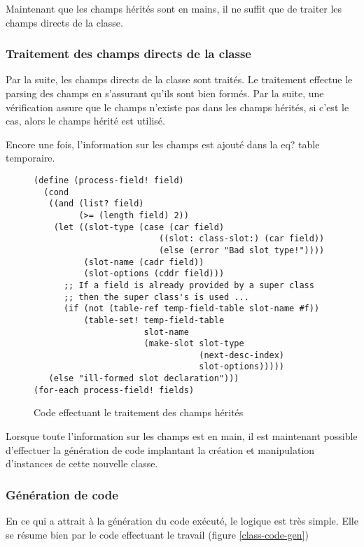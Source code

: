       Maintenant que les champs hérités sont en mains, il ne suffit que de
      traiter les champs directs de la classe.

    \subsubsection{Traitement des champs directs de la classe}
      Par la suite, les champs directs de la classe sont traités. Le
      traitement effectue le \og parsing \fg des champs en s'assurant
      qu'ils sont bien formés. Par la suite, une vérification assure
      que le champs n'existe pas dans les champs hérités, si c'est le
      cas, alors le champs hérité est utilisé.

      Encore une fois, l'information sur les champs est ajouté dans la
      \og eq? table \fg temporaire.

      \begin{figure}[h!]
        \begin{lstlisting}
(define (process-field! field)
  (cond
   ((and (list? field)
         (>= (length field) 2))
    (let ((slot-type (case (car field)
                         ((slot: class-slot:) (car field))
                         (else (error "Bad slot type!"))))
          (slot-name (cadr field))
          (slot-options (cddr field)))
      ;; If a field is already provided by a super class
      ;; then the super class's is used ...
      (if (not (table-ref temp-field-table slot-name #f))
          (table-set! temp-field-table
                      slot-name
                      (make-slot slot-type
                                 (next-desc-index)
                                 slot-options)))))
   (else "ill-formed slot declaration")))
(for-each process-field! fields)
        \end{lstlisting}
        \caption{Code effectuant le traitement des champs hérités}
      \end{figure}

      Lorsque toute l'information sur les champs est en main, il est
      maintenant possible d'effectuer la génération de code implantant
      la création et manipulation d'instances de cette nouvelle classe.

    \subsubsection{Génération de code}
      En ce qui a attrait à la génération du code exécuté, le logique
      est très simple. Elle se résume bien par le code effectuant le
      travail (figure \ref{class-code-gen})

